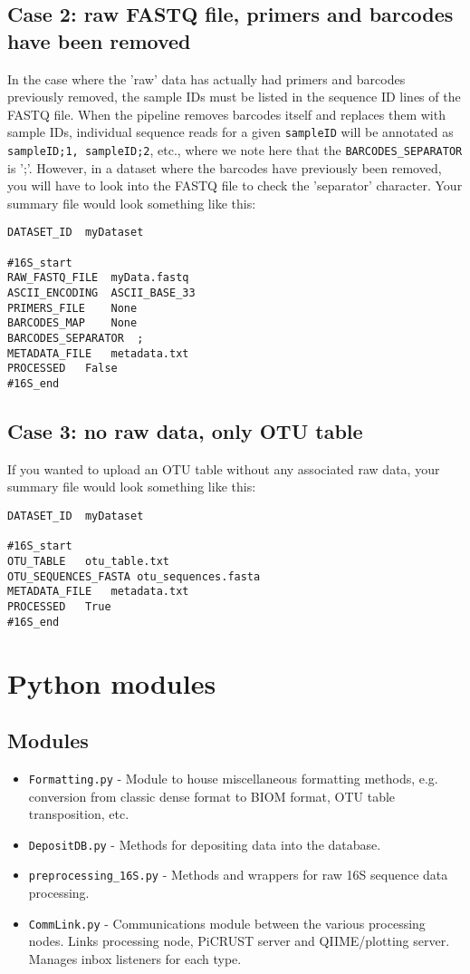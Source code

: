 \documentclass[11pt, oneside]{article}   	%
\begin{document}
\subsection{Case 2: raw FASTQ file, primers and barcodes have been removed}
In the case where the 'raw' data has actually had primers and barcodes previously removed, the sample IDs must be listed in the sequence ID lines of the FASTQ file.  When the pipeline removes barcodes itself and replaces them with sample IDs, individual sequence reads for a given {\tt sampleID} will be annotated as {\tt sampleID;1, sampleID;2}, etc., where we note here that the {\tt BARCODES\_SEPARATOR} is ';'.  However, in a dataset where the barcodes have previously been removed, you will have to look into the FASTQ file to check the 'separator' character.  Your summary file would look something like this:

\begin{verbatim}
DATASET_ID	myDataset

#16S_start
RAW_FASTQ_FILE	myData.fastq
ASCII_ENCODING	ASCII_BASE_33
PRIMERS_FILE	None
BARCODES_MAP	None
BARCODES_SEPARATOR	;
METADATA_FILE	metadata.txt
PROCESSED	False
#16S_end
\end{verbatim}
		
		
\subsection{Case 3: no raw data, only OTU table}		
If you wanted to upload an OTU table without any associated raw data, your summary file would look something like this:
\begin{verbatim}
DATASET_ID	myDataset

#16S_start
OTU_TABLE	otu_table.txt
OTU_SEQUENCES_FASTA	otu_sequences.fasta
METADATA_FILE	metadata.txt
PROCESSED	True
#16S_end
\end{verbatim}


\section{Python modules}
\subsection{Modules}
\begin{itemize}
  \item {\tt Formatting.py} - Module to house miscellaneous formatting methods, e.g. conversion from classic dense format to BIOM format, OTU table transposition, etc.
	\item {\tt DepositDB.py} - Methods for depositing data into the database.
	\item {\tt preprocessing\_16S.py} - Methods and wrappers for raw 16S sequence data processing.
	\item {\tt CommLink.py} - Communications module between the various processing nodes.  Links processing node, PiCRUST server and QIIME/plotting server.  Manages inbox listeners for each type.
\end{itemize}
\end{document}
